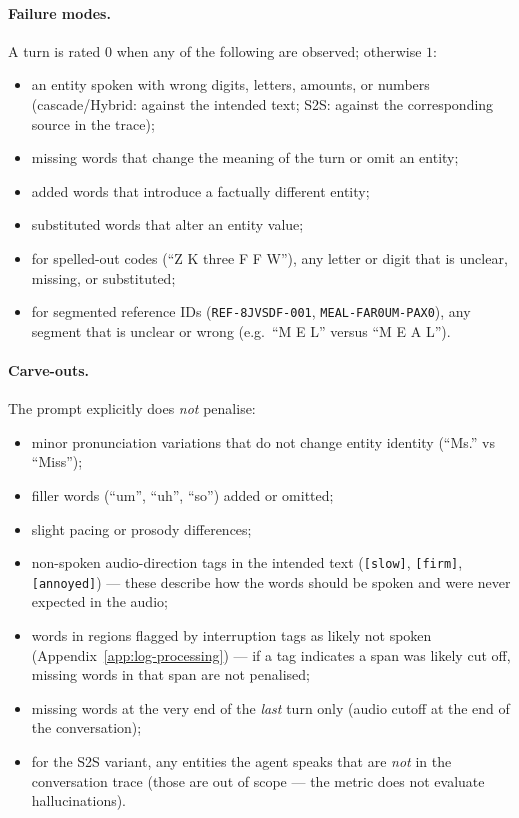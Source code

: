 \paragraph{Failure modes.} A turn is rated $0$ when any of the following are observed; otherwise $1$:
\begin{itemize}
    \item an entity spoken with wrong digits, letters, amounts, or numbers (cascade/Hybrid: against the intended text; S2S: against the corresponding source in the trace);
    \item missing words that change the meaning of the turn or omit an entity;
    \item added words that introduce a factually different entity;
    \item substituted words that alter an entity value;
    \item for spelled-out codes (``Z K three F F W''), any letter or digit that is unclear, missing, or substituted;
    \item for segmented reference IDs (\texttt{REF-8JVSDF-001}, \texttt{MEAL-FAR0UM-PAX0}), any segment that is unclear or wrong (e.g.\ ``M E L'' versus ``M E A L'').
\end{itemize}

\paragraph{Carve-outs.} The prompt explicitly does \emph{not} penalise:
\begin{itemize}
    \item minor pronunciation variations that do not change entity identity (``Ms.'' vs ``Miss'');
    \item filler words (``um'', ``uh'', ``so'') added or omitted;
    \item slight pacing or prosody differences;
    \item non-spoken audio-direction tags in the intended text (\texttt{[slow]}, \texttt{[firm]}, \texttt{[annoyed]}) --- these describe how the words should be spoken and were never expected in the audio;
    \item words in regions flagged by interruption tags as likely not spoken (Appendix~\ref{app:log-processing}) --- if a tag indicates a span was likely cut off, missing words in that span are not penalised;
    \item missing words at the very end of the \emph{last} turn only (audio cutoff at the end of the conversation);
    \item for the S2S variant, any entities the agent speaks that are \emph{not} in the conversation trace (those are out of scope --- the metric does not evaluate hallucinations).
\end{itemize}

